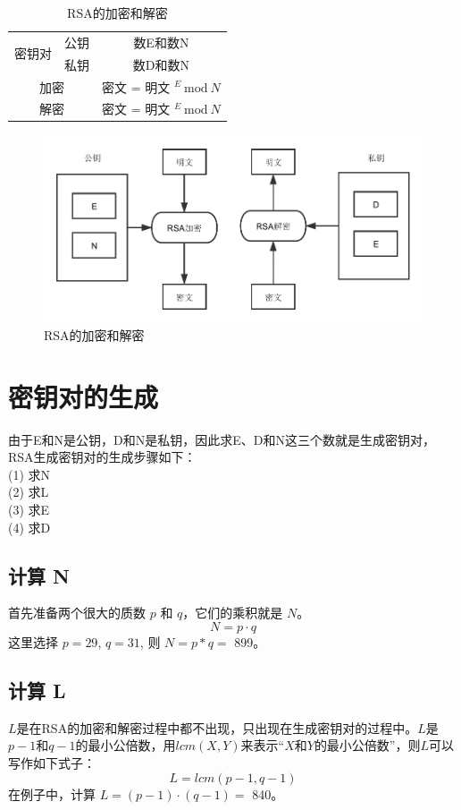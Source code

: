 \documentclass[UTF8,nofonts,cs4size]{ctexrep}
\begin{document}
\begin{table}[!hbp]
\centering
\begin{tabular}{|c|c|c|}
\hline
\hline

\multirow{2}{*}{密钥对} & 公钥 & 数E和数N \\
\cline{2-3}
 \multirow{2}{*}{} & 私钥& 数D和数N \\
\hline
\multicolumn{2}{|c|}{加密} & 密文 = 明文 $^E \ \mathrm{mod}\ N $\\
\hline
\multicolumn{2}{|c|}{解密} & 密文 = 明文 $^E \ \mathrm{mod}\ N $\\
\hline

\end{tabular}

\caption{RSA的加密和解密}
\end{table}

\begin{figure}{}
\centering
\includegraphics[scale = 0.8]{RSA.pdf}
\caption{RSA的加密和解密}
\end{figure}

\section{密钥对的生成}
由于E和N是公钥，D和N是私钥，因此求E、D和N这三个数就是生成密钥对，RSA生成密钥对的生成步骤如下：\\
\indent (1) 求N \\
\indent (2) 求L \\
\indent (3) 求E\\
\indent (4) 求D
\subsection{计算 N}
首先准备两个很大的质数 $p$ 和 $q$，它们的乘积就是 $N$。
$$N = p \cdot q $$
\indent 这里选择 $p = 29$, $q = 31$, 则 $N = p * q =$ 899。 

\subsection{计算 L}
$L$是在RSA的加密和解密过程中都不出现，只出现在生成密钥对的过程中。$L$是$p-1$和$q-1$的最小公倍数，用$lcm(X,Y)$来表示“$X$和$Y$的最小公倍数”，则$L$可以写作如下式子：
$$L = lcm(p-1,q-1)$$
\indent 在例子中，计算 $L = ( p - 1 ) \cdot ( q - 1 )=$ 840。
\end{document}
